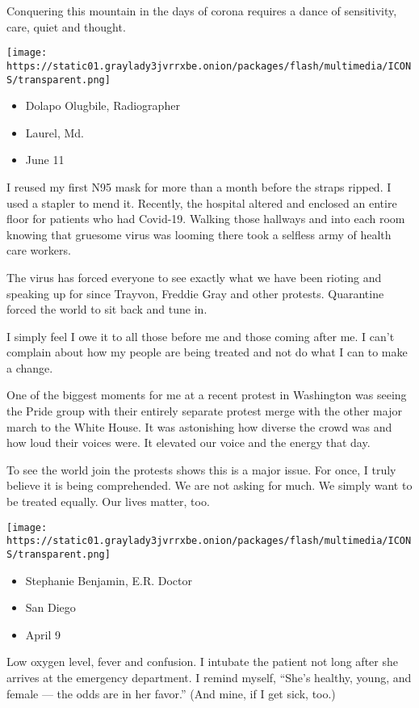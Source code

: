Conquering this mountain in the days of corona requires a dance of
sensitivity, care, quiet and thought.

\texttt{[image: https://static01.graylady3jvrrxbe.onion/packages/flash/multimedia/ICONS/transparent.png]}

\begin{itemize}
\tightlist
\item
  Dolapo Olugbile, Radiographer
\item
  Laurel, Md.
\item
  June 11
\end{itemize}

I reused my first N95 mask for more than a month before the straps
ripped. I used a stapler to mend it. Recently, the hospital altered and
enclosed an entire floor for patients who had Covid-19. Walking those
hallways and into each room knowing that gruesome virus was looming
there took a selfless army of health care workers.

The virus has forced everyone to see exactly what we have been rioting
and speaking up for since Trayvon, Freddie Gray and other protests.
Quarantine forced the world to sit back and tune in.

I simply feel I owe it to all those before me and those coming after me.
I can't complain about how my people are being treated and not do what I
can to make a change.

One of the biggest moments for me at a recent protest in Washington was
seeing the Pride group with their entirely separate protest merge with
the other major march to the White House. It was astonishing how diverse
the crowd was and how loud their voices were. It elevated our voice and
the energy that day.

To see the world join the protests shows this is a major issue. For
once, I truly believe it is being comprehended. We are not asking for
much. We simply want to be treated equally. Our lives matter, too.

\texttt{[image: https://static01.graylady3jvrrxbe.onion/packages/flash/multimedia/ICONS/transparent.png]}

\begin{itemize}
\tightlist
\item
  Stephanie Benjamin, E.R. Doctor
\item
  San Diego
\item
  April 9
\end{itemize}

Low oxygen level, fever and confusion. I intubate the patient not long
after she arrives at the emergency department. I remind myself, ``She's
healthy, young, and female --- the odds are in her favor.'' (And mine,
if I get sick, too.)

